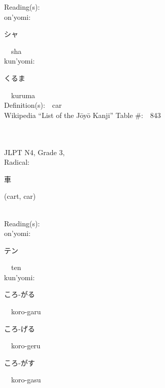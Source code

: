 \begin{multicols}{2}
Reading(s):\ \ \\
{\hspace*{1em}}on'yomi:\ \ \\
{\hspace*{2em}}{\begin{CJK}{UTF8}{min} シャ \end{CJK}}\ \ sha\ \ \\
{\hspace*{1em}}kun'yomi:\ \ \\
{\hspace*{2em}}{\begin{CJK}{UTF8}{min} くるま \end{CJK}}\ \ kuruma\ \ \\
Definition(s):\ \ car \\
Wikipedia ``List of the J\=oy\=o Kanji'' Table \#:\ \ 843 \\
\ \ \\
{\fontsize{34pt}{40pt}  }\ \ \\  %
{JLPT N4, Grade 3, \\Radical:\ \ {\begin{CJK}{UTF8}{min} 車 \end{CJK}} (cart, car) } \\
Reading(s):\ \ \\
{\hspace*{1em}}on'yomi:\ \ \\
{\hspace*{2em}}{\begin{CJK}{UTF8}{min} テン \end{CJK}}\ \ ten\ \ \\
{\hspace*{1em}}kun'yomi:\ \ \\
{\hspace*{2em}}{\begin{CJK}{UTF8}{min} ころ-がる \end{CJK}}\ \ koro-garu\ \ \\
{\hspace*{2em}}{\begin{CJK}{UTF8}{min} ころ-げる \end{CJK}}\ \ koro-geru\ \ \\
{\hspace*{2em}}{\begin{CJK}{UTF8}{min} ころ-がす \end{CJK}}\ \ koro-gasu\ \ \\

\end{multicols}

